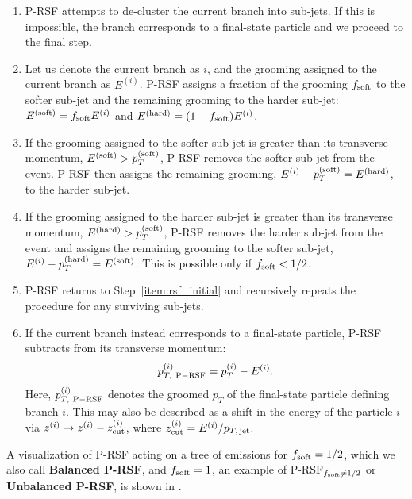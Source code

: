 \documentclass[letterpaper,11pt]{article}
\begin{document}
\begin{enumerate}
    \item
    P-RSF attempts to de-cluster the current branch into sub-jets.
    If this is impossible, the branch corresponds to a final-state particle and we proceed to the final step.
    \label{item:rsf_initial}

    \item
    Let us denote the current branch as \(i\), and the grooming assigned to the current branch as \(E^{(i)}\).
    P-RSF assigns a fraction of the grooming \(f_{\rm soft}\) to the softer sub-jet and the remaining grooming to the harder sub-jet:
    \(E^{\rm(soft)} = f_{\rm soft} E^{(i)}\) and \(E^{\rm(hard)} = (1-f_{\rm soft})E^{(i)}\).
    \label{item:rsf_softhard}

    \item
    If the grooming assigned to the softer sub-jet is greater than its transverse momentum, \(E^{\rm(soft)} > p_T^{(\rm soft)}\), P-RSF removes the softer sub-jet from the event.
    P-RSF then assigns the remaining grooming, \(E^{(i)} - p_T^{(\rm soft)} = E^{\rm(hard)}\), to the harder sub-jet.
    \label{item:remove_soft}

    \item
    If the grooming assigned to the harder sub-jet is greater than its transverse momentum, \(E^{\rm(hard)} > p_T^{(\rm soft)}\), P-RSF removes the harder sub-jet from the event and assigns the remaining grooming to the softer sub-jet, \(E^{(i)} - p_T^{(\rm hard)} = E^{\rm(soft)}\).
    This is possible only if \(f_{\rm soft} < 1/2\).
    \label{item:remove_hard}

    \item
    P-RSF returns to Step~\ref{item:rsf_initial} and recursively repeats the procedure for any surviving sub-jets.

        \item
        If the current branch instead corresponds to a final-state particle, P-RSF subtracts from its transverse momentum:
    \begin{align}
        p^{(i)}_{T,~{\rm P-RSF}} = p^{(i)}_T - E^{(i)}.
    \end{align}
    Here, \(p^{(i)}_{T,~{\rm P-RSF}}\) denotes the groomed \(p_T\) of the final-state particle defining branch \(i\).
    This may also be described as a shift in the energy of the particle \(i\) via \(z^{(i)}\to z^{(i)} - z^{(i)}_{\rm cut}\), where \(z^{(i)}_{\rm cut} = E^{(i)} / p_{T,\,{\rm jet}}\).
        \label{item:rsf_final}
\end{enumerate}
%
A visualization of P-RSF acting on a tree of emissions for \(f_{\rm soft} = 1/2\), which we also call \textbf{Balanced P-RSF}, and \(f_{\rm soft} = 1\), an example of P-RSF\(_{f_{\rm soft}\neq1/2}\) or \textbf{Unbalanced P-RSF}, is shown in .
\end{document}
